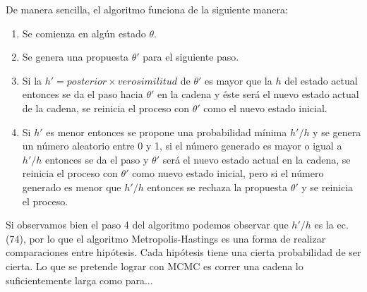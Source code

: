 \documentclass{article}
\begin{document}
De manera sencilla, el algoritmo funciona de la siguiente manera:

\begin{enumerate}
\item Se comienza en alg\'un estado $\theta$.
\item Se genera una propuesta $\theta'$ para el siguiente paso.
\item Si la $h'=posterior \times verosimilitud$ de $\theta'$ es mayor que la $h$ del estado actual entonces se da el paso hacia $\theta'$ en la cadena y \'este ser\'a el nuevo estado actual de la cadena, se reinicia el proceso con $\theta'$ como el nuevo estado inicial. 
\item Si $h'$ es menor entonces se propone una probabilidad m\'inima $h'/h$ y se genera un n\'umero aleatorio entre 0 y 1, si el n\'umero generado es mayor o igual a $h'/h$ entonces se da el paso y $\theta'$ ser\'a el nuevo estado actual en la cadena, se reinicia el proceso con $\theta'$ como nuevo estado inicial, pero si el n\'umero generado es menor que $h'/h$ entonces se rechaza la propuesta $\theta'$ y se reinicia el proceso.
\end{enumerate}

Si observamos bien el paso 4 del algoritmo podemos observar que $h'/h$ es la ec. (74), por lo que el algoritmo Metropolis-Hastings es una forma de realizar comparaciones entre hip\'otesis. Cada hip\'otesis tiene una cierta probabilidad de ser cierta. Lo que se pretende lograr con MCMC es correr una cadena lo suficientemente larga como para...
\end{document}
